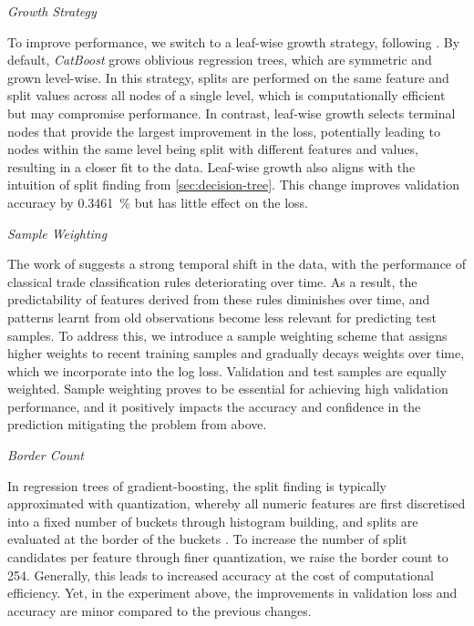 \emph{Growth Strategy}

To improve performance, we switch to a leaf-wise growth strategy, following \textcite[][4]{chenXGBoostScalableTree2016}. By default, \emph{CatBoost} grows oblivious regression trees, which are symmetric and grown level-wise. In this strategy, splits are performed on the same feature and split values across all nodes of a single level, which is computationally efficient but may compromise performance. In contrast, leaf-wise growth selects terminal nodes that provide the largest improvement in the loss, potentially leading to nodes within the same level being split with different features and values, resulting in a closer fit to the data. Leaf-wise growth also aligns with the intuition of split finding from \cref{sec:decision-tree}. This change improves validation accuracy by \SI{0.3461}{\percent} but has little effect on the loss.

\emph{Sample Weighting}

The work of \textcite[][36--38]{grauerOptionTradeClassification2022} suggests a strong temporal shift in the data, with the performance of classical trade classification rules deteriorating over time.  As a result, the predictability of features derived from these rules diminishes over time, and patterns learnt from old observations become less relevant for predicting test samples. To address this, we introduce a sample weighting scheme that assigns higher weights to recent training samples and gradually decays weights over time, which we incorporate into the log loss. Validation and test samples are equally weighted. Sample weighting proves to be essential for achieving high validation performance, and it positively impacts the accuracy and confidence in the prediction mitigating the problem from above.

\emph{Border Count}

In regression trees of gradient-boosting, the split finding is typically approximated with quantization, whereby all numeric features are first discretised into a fixed number of buckets through histogram building, and splits are evaluated at the border of the buckets \autocites[][4]{dorogushCatBoostGradientBoosting}[][2]{keLightGBMHighlyEfficient2017}. To increase the number of split candidates per feature through finer quantization, we raise the border count to \num{254}. Generally, this leads to increased accuracy at the cost of computational efficiency. Yet, in the experiment above, the improvements in validation loss and accuracy are minor compared to the previous changes.

